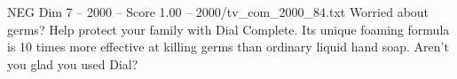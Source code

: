\begin{textsample}{NEG Dim 7 – 2000 – Score 1.00 – 2000/tv\_com\_2000\_84.txt}  \label{ex:f7_neg_047}
Worried about germs?
Help protect your family with Dial Complete.
Its unique foaming formula is 10 times more effective at killing germs than ordinary liquid hand soap.
Aren't you glad you used Dial?

\end{textsample}

